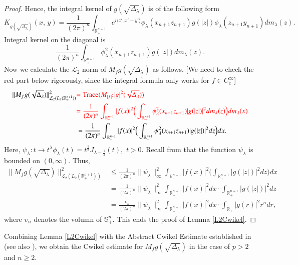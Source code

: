 \documentclass[12pt]{amsart}
\begin{document}
\begin{proof}
Hence, the integral kernel of $g(\sqrt{\Delta_{\lambda}})$ is of the following form
$$K_{g(\sqrt{\Delta_{\lambda}})}(x,\,y)=\frac{1}{(2\pi)^n}\int_{\mathbb{R}_+^{n+1}}e^{i\langle z',x'-y'\rangle}\phi_\lambda(x_{n+1}z_{n+1})g(|z|)\phi_\lambda(z_{n+1}y_{n+1})dm_\lambda(z).$$
Integral kernel on the diagonal is
$$\frac{1}{(2\pi)^n}\int_{\mathbb{R}_+^{n+1}}\phi_\lambda^2(x_{n+1}z_{n+1})g(|z|)dm_\lambda(z).$$
Now we calculate the $\mathcal{L}_2$ norm of $M_fg(\sqrt{\Delta_{\lambda}})$ as follows. {\color{red}[We need to check the red part below rigorously, since the integral formula only works for $f\in C_c^\infty$]
}
\begin{align*}
\|M_fg(\sqrt{\Delta_{\lambda}})\|_{\mathcal{L}_2(L_2(\mathbb{R}_+^{n+1}))}^2&{\color{red}={\rm Trace}(M_{|f|^2}|g|^2(\sqrt{\Delta_{\lambda}}))}\\
&{\color{red}=\frac{1}{(2\pi)^n}\int_{\mathbb{R}_+^{n+1}}|f(x)|^2\Big(\int_{\mathbb{R}_+^{n+1}}\phi_\lambda^2(x_{n+1}z_{n+1})|g(|z|)|^2dm_\lambda(z)\Big)dm_\lambda(x)}\\
&=\frac{1}{(2\pi)^n}\int_{\mathbb{R}_+^{n+1}}|f(x)|^2\Big(\int_{\mathbb{R}_+^{n+1}}\psi_{\lambda}^2(x_{n+1}z_{n+1})|g(|z|)|^2dz\Big)dx.
\end{align*}
Here, $\psi_{\lambda}:t\to t^{\lambda}\phi_{\lambda}(t)=t^{\frac12}J_{\lambda-\frac12}(t),$ $t>0.$ Recall from \cite[p.364]{MR167642} that the function $\psi_{\lambda}$ is bounded on $(0,\infty).$ Thus,
\begin{align*}
\|M_fg(\sqrt{\Delta_{\lambda}})\|_{\mathcal{L}_2(L_2(\mathbb{R}_+^{n+1}))}^2
&\leq\frac{1}{(2\pi)^n}\|\psi_{\lambda}\|_{\infty}^2\int_{\mathbb{R}_+^{n+1}}|f(x)|^2\Big(\int_{\mathbb{R}_+^{n+1}}|g(|z|)|^2dz\Big)dx\\
&=\frac{1}{(2\pi)^n}\|\psi_{\lambda}\|_{\infty}^2\int_{\mathbb{R}_+^{n+1}}|f(x)|^2dx\cdot \int_{\mathbb{R}_+^{n+1}}|g(|z|)|^2dz\\
&=\frac{\upsilon_n}{(2\pi)^n}\|\psi_{\lambda}\|_{\infty}^2\int_{\mathbb{R}_+^{n+1}}|f(x)|^2dx\cdot \int_{\mathbb{R}_+}|g(r)|^2r^ndr,
\end{align*}
where $\upsilon_n$ denotes the volumn of $\mathbb{S}^n_+$. This ends the proof of Lemma \ref{L2Cwikel}.
\end{proof}


Combining  Lemma \ref{L2Cwikel} with the Abstract Cwikel Estimate established in \cite{LeSZ} (see also \cite[Theorem 1.5.10]{LSZ2}), we obtain the Cwikel estimate for $M_fg(\sqrt{\Delta_{\lambda}})$ in the case of $p>2$ and $n\geq 2.$
\end{document}
